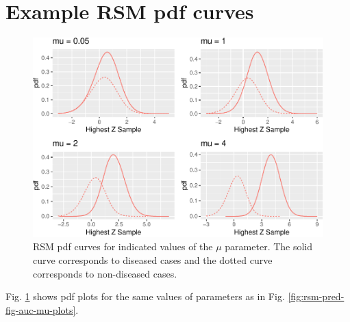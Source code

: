 \documentclass[
]{book}
\begin{document}
\hypertarget{rsm-pred-pdf-curves}{%
\section{Example RSM pdf curves}\label{rsm-pred-pdf-curves}}

\begin{figure}
\centering
\includegraphics{07-rsm-predictions_files/figure-latex/rsm-pred-fig-pdf-mu-plots-1.pdf}
\caption{\label{fig:rsm-pred-fig-pdf-mu-plots}RSM pdf curves for indicated values of the \(\mu\) parameter. The solid curve corresponds to diseased cases and the dotted curve corresponds to non-diseased cases.}
\end{figure}

Fig. \ref{fig:rsm-pred-fig-pdf-mu-plots} shows pdf plots for the same values of parameters as in Fig. \ref{fig:rsm-pred-fig-auc-mu-plots}.
\end{document}
